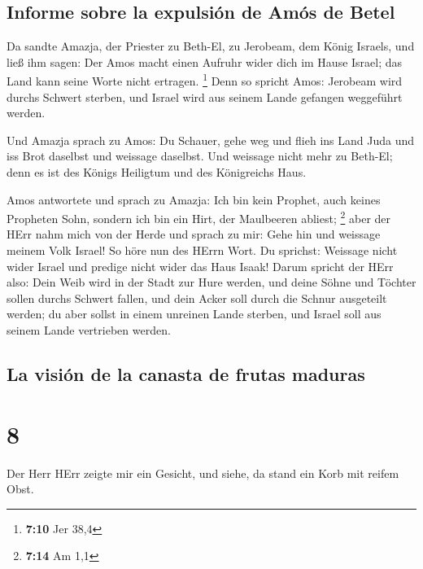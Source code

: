 \hypertarget{informe-sobre-la-expulsiuxf3n-de-amuxf3s-de-betel}{%
\subsection{Informe sobre la expulsión de Amós de
Betel}\label{informe-sobre-la-expulsiuxf3n-de-amuxf3s-de-betel}}

 Da sandte Amazja, der Priester zu Beth-El, zu Jerobeam,
dem König Israels, und ließ ihm sagen: Der Amos macht einen Aufruhr
wider dich im Hause Israel; das Land kann seine Worte nicht ertragen.
\footnote{\textbf{7:10} Jer 38,4}  Denn so spricht Amos:
Jerobeam wird durchs Schwert sterben, und Israel wird aus seinem Lande
gefangen weggeführt werden.

 Und Amazja sprach zu Amos: Du Schauer, gehe weg und
flieh ins Land Juda und iss Brot daselbst und weissage daselbst.
 Und weissage nicht mehr zu Beth-El; denn es ist des
Königs Heiligtum und des Königreichs Haus.

 Amos antwortete und sprach zu Amazja: Ich bin kein
Prophet, auch keines Propheten Sohn, sondern ich bin ein Hirt, der
Maulbeeren abliest; \footnote{\textbf{7:14} Am 1,1}  aber
der HErr nahm mich von der Herde und sprach zu mir: Gehe hin und
weissage meinem Volk Israel!  So höre nun des HErrn Wort.
Du sprichst: Weissage nicht wider Israel und predige nicht wider das
Haus Isaak!  Darum spricht der HErr also: Dein Weib wird
in der Stadt zur Hure werden, und deine Söhne und Töchter sollen durchs
Schwert fallen, und dein Acker soll durch die Schnur ausgeteilt werden;
du aber sollst in einem unreinen Lande sterben, und Israel soll aus
seinem Lande vertrieben werden.

\hypertarget{la-visiuxf3n-de-la-canasta-de-frutas-maduras}{%
\subsection{La visión de la canasta de frutas
maduras}\label{la-visiuxf3n-de-la-canasta-de-frutas-maduras}}

\hypertarget{section-7}{%
\section{8}\label{section-7}}

 Der Herr HErr zeigte mir ein Gesicht, und siehe, da stand
ein Korb mit reifem Obst.

